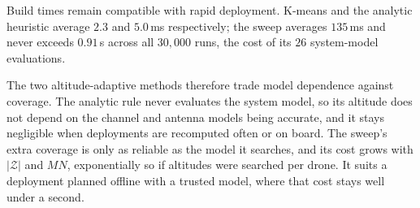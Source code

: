 \documentclass[conference]{IEEEtran}
\begin{document}
Build times remain compatible with rapid deployment. K-means and the analytic heuristic average $2.3$ and $5.0$\,ms respectively; the sweep averages $135$\,ms and never exceeds $0.91$\,s across all $30{,}000$ runs, the cost of its $26$ system-model evaluations.

The two altitude-adaptive methods therefore trade model dependence against coverage. The analytic rule never evaluates the system model, so its altitude does not depend on the channel and antenna models being accurate, and it stays negligible when deployments are recomputed often or on board. The sweep's extra coverage is only as reliable as the model it searches, and its cost grows with $|\mathcal{Z}|$ and $MN$, exponentially so if altitudes were searched per drone. It suits a deployment planned offline with a trusted model, where that cost stays well under a second.


\end{document}
